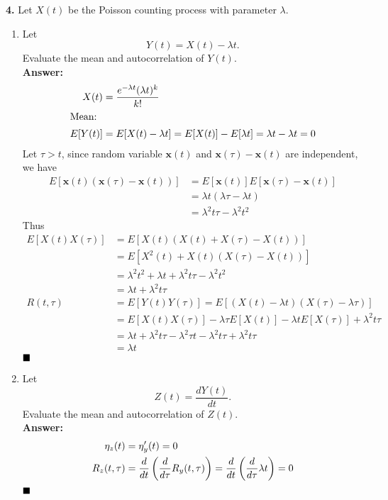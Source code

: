 \textbf{4.} Let $X(t)$ be the Poisson counting process with parameter $\lambda$.
  \begin{enumerate}
  \item Let
    $$ Y(t) = X(t) - \lambda t .$$
    Evaluate the mean and autocorrelation of $Y(t)$.\\
    \textbf{Answer:}\\
    \begin{align*}
      X(t) & = \dfrac{e^{-\lambda t}(\lambda t)^k}{k!}\\
      \shortintertext{Mean:}
      E[Y(t)] & = E[X(t) - \lambda t] = E[X(t)] - E[\lambda t] = \lambda t - \lambda t = 0 \\
    \end{align*}
    Let $\tau > t$, since random variable $\textbf{x}(t)$ and $\textbf{x}(\tau) - \textbf{x}(t)$ are independent, we have
    \begin{align*}
      E[\textbf{x}(t)(\textbf{x}(\tau) - \textbf{x}(t))] & = E[\textbf{x}(t)]E[\textbf{x}(\tau) - \textbf{x}(t)] \\
                                                         & = \lambda t (\lambda \tau - \lambda t) \\
                                                         & = \lambda^2t\tau - \lambda^2t^2
    \end{align*}
    Thus
    \begin{align*}
      E[X(t)X(\tau)] & = E[X(t)(X(t) + X(\tau) - X(t))] \\
                     & = E[X^2(t) + X(t)(X(\tau) - X(t))] \\
                     & = \lambda^2t^2  + \lambda t + \lambda^2t\tau - \lambda^2t^2\\
                     & = \lambda t + \lambda^2t\tau \\
      R(t, \tau) & = E[Y(t)Y(\tau)] = E[(X(t) - \lambda t)(X(\tau) - \lambda \tau)] \\
                     & = E[X(t)X(\tau)] - \lambda \tau E[X(t)] - \lambda t E[X(\tau)] + \lambda^2 t \tau \\
                     & = \lambda t + \lambda^2 t \tau - \lambda^2 \tau t - \lambda^2 t \tau + \lambda^2 t \tau \\
                     & = \lambda t
    \end{align*}
    $\hfill\blacksquare$
  \item Let
    $$Z(t) = \frac{dY(t)}{dt}.$$
    Evaluate the mean and autocorrelation of $Z(t)$.\\
    \textbf{Answer:}\\
    \begin{align*}
      \eta_z (t) & = \eta'_y (t) = 0 \\
      R_z(t, \tau) & = \dfrac{d}{dt} \left( \dfrac{d}{d\tau} R_y(t, \tau) \right)
                     = \dfrac{d}{dt} \left( \dfrac{d}{d\tau}  \lambda t \right) = 0
    \end{align*} $\hfill\blacksquare$


\end{enumerate}
